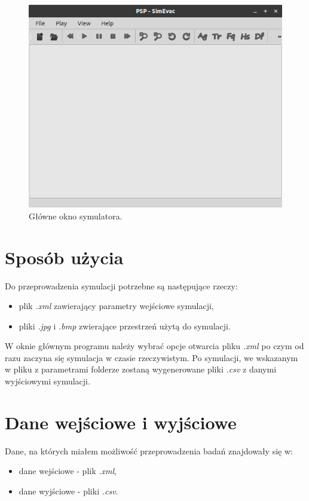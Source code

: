 \documentclass[12pt]{aghdpl}
\newenvironment{tightcenter}{
  \setlength\topsep{0pt}
  \setlength\parskip{0pt}
  \begin{center}
}{
  \end{center}
}
\begin{document}
		\begin{figure}[h]
	 		\begin{tightcenter}
	 			\includegraphics[width = 0.75\linewidth]{rysunki/symulator.png}
	 		\end{tightcenter}
	 		
			\caption{Główne okno symulatora.}
			\label{fig: glowne_okno_symulatora}
		\end{figure}
	
		\section{Sposób użycia}
		Do przeprowadzenia symulacji potrzebne są następujące rzeczy:
		\begin{itemize}
		\item plik \textit{.xml} zawierający parametry wejściowe symulacji,
		\item pliki \textit{.jpg} i \textit{.bmp} zwierające przestrzeń użytą do symulacji.
		\end{itemize}
	
		W oknie głównym programu należy wybrać opcje otwarcia pliku \textit{.xml} po czym od razu zaczyna się symulacja w czasie rzeczywistym. Po symulacji, we wskazanym w pliku z parametrami folderze zostaną wygenerowane pliki \textit{.csv} z danymi wyjściowymi symulacji.
		
		\section{Dane wejściowe i wyjściowe}
		Dane, na których miałem możliwość przeprowadzenia badań znajdowały się w:
		\begin{itemize}
		\item dane wejściowe - plik \textit{.xml},
		\item dane wyjściowe - pliki \textit{.csv}.
		\end{itemize}
		
\end{document}
